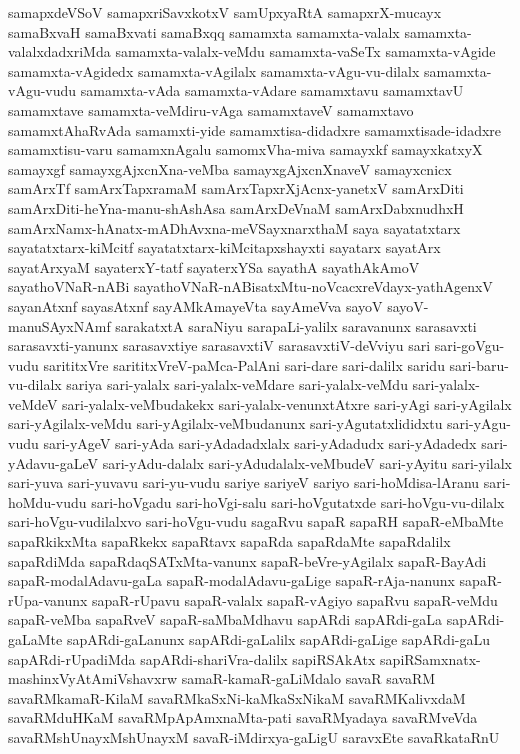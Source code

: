{samapxdeVSoV
samapxriSavxkotxV
samUpxyaRtA
samapxrX-mucayx
samaBxvaH
samaBxvati
samaBxqq
samamxta
samamxta-valalx
samamxta-valalxdadxriMda
samamxta-valalx-veMdu
samamxta-vaSeTx
samamxta-vAgide
samamxta-vAgidedx
samamxta-vAgilalx
samamxta-vAgu-vu-dilalx
samamxta-vAgu-vudu
samamxta-vAda
samamxta-vAdare
samamxtavu
samamxtavU
samamxtave
samamxta-veMdiru-vAga
samamxtaveV
samamxtavo
samamxtAhaRvAda
samamxti-yide
samamxtisa-didadxre
samamxtisade-idadxre
samamxtisu-varu
samamxnAgalu
samomxVha-miva
samayxkf
samayxkatxyX
samayxgf
samayxgAjxcnXna-veMba
samayxgAjxcnXnaveV
samayxcnicx
samArxTf
samArxTapxramaM
samArxTapxrXjAcnx-yanetxV
samArxDiti
samArxDiti-heYna-manu-shAshAsa
samArxDeVnaM
samArxDabxnudhxH
samArxNamx-hAnatx-mADhAvxna-meVSayxnarxthaM
saya
sayatatxtarx
sayatatxtarx-kiMcitf
sayatatxtarx-kiMcitapxshayxti
sayatarx
sayatArx
sayatArxyaM
sayaterxY-tatf
sayaterxYSa
sayathA
sayathAkAmoV
sayathoVNaR-nABi
sayathoVNaR-nABisatxMtu-noVcacxreVdayx-yathAgenxV
sayanAtxnf
sayasAtxnf
sayAMkAmayeVta
sayAmeVva
sayoV
sayoV-manuSAyxNAmf
sarakatxtA
saraNiyu
sarapaLi-yalilx
saravanunx
sarasavxti
sarasavxti-yanunx
sarasavxtiye
sarasavxtiV
sarasavxtiV-deVviyu
sari
sari-goVgu-vudu
sarititxVre
sarititxVreV-paMca-PalAni
sari-dare
sari-dalilx
saridu
sari-baru-vu-dilalx
sariya
sari-yalalx
sari-yalalx-veMdare
sari-yalalx-veMdu
sari-yalalx-veMdeV
sari-yalalx-veMbudakekx
sari-yalalx-venunxtAtxre
sari-yAgi
sari-yAgilalx
sari-yAgilalx-veMdu
sari-yAgilalx-veMbudanunx
sari-yAgutatxlididxtu
sari-yAgu-vudu
sari-yAgeV
sari-yAda
sari-yAdadadxlalx
sari-yAdadudx
sari-yAdadedx
sari-yAdavu-gaLeV
sari-yAdu-dalalx
sari-yAdudalalx-veMbudeV
sari-yAyitu
sari-yilalx
sari-yuva
sari-yuvavu
sari-yu-vudu
sariye
sariyeV
sariyo
sari-hoMdisa-lAranu
sari-hoMdu-vudu
sari-hoVgadu
sari-hoVgi-salu
sari-hoVgutatxde
sari-hoVgu-vu-dilalx
sari-hoVgu-vudilalxvo
sari-hoVgu-vudu
sagaRvu
sapaR
sapaRH
sapaR-eMbaMte
sapaRkikxMta
sapaRkekx
sapaRtavx
sapaRda
sapaRdaMte
sapaRdalilx
sapaRdiMda
sapaRdaqSATxMta-vanunx
sapaR-beVre-yAgilalx
sapaR-BayAdi
sapaR-modalAdavu-gaLa
sapaR-modalAdavu-gaLige
sapaR-rAja-nanunx
sapaR-rUpa-vanunx
sapaR-rUpavu
sapaR-valalx
sapaR-vAgiyo
sapaRvu
sapaR-veMdu
sapaR-veMba
sapaRveV
sapaR-saMbaMdhavu
sapARdi
sapARdi-gaLa
sapARdi-gaLaMte
sapARdi-gaLanunx
sapARdi-gaLalilx
sapARdi-gaLige
sapARdi-gaLu
sapARdi-rUpadiMda
sapARdi-shariVra-dalilx
sapiRSAkAtx
sapiRSamxnatx-mashinxVyAtAmiVshavxrw
samaR-kamaR-gaLiMdalo
savaR
savaRM
savaRMkamaR-KilaM
savaRMkaSxNi-kaMkaSxNikaM
savaRMKalivxdaM
savaRMduHKaM
savaRMpApAmxnaMta-pati
savaRMyadaya
savaRMveVda
savaRMshUnayxMshUnayxM
savaR-iMdirxya-gaLigU
saravxEte
savaRkataRnU
}
